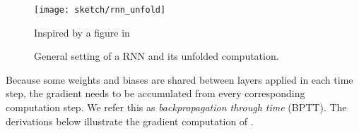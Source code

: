 \begin{figure}
\centering
\texttt{[image: sketch/rnn\_unfold]}
\caption{General setting of a RNN and its unfolded computation.}
\small{Inspired by a figure in \cite{OlahUnderstandingLSTMNetworks2015} }
\label{fig:rnn_unfold} 
\end{figure}

Because some weights and biases are shared between layers applied in each time step, the gradient needs to be accumulated from every corresponding computation step. We refer this as \textit{backpropagation through time} (BPTT). The derivations below illustrate the gradient computation of \addfigure{\ref{fig:rnn_unfold}}.

%
%


